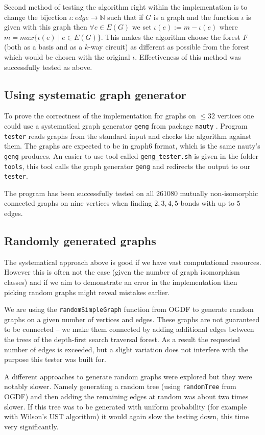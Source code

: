Second method of testing the algorithm right within the implementation is to change the bijection $\iota : edge \rightarrow \mathbb{N}$ such that if $G$ is a graph and the function $\iota$ is given with this graph then $\forall e \in E(G)$ we set $\iota(e) := m - \iota(e)$ where $m = max \{ \iota(e) \mid e \in E(G) \}$. This makes the algorithm choose the forest $F$ (both as a basis and as a $k$-way circuit) as different as possible from the forest which would be chosen with the original $\iota$. Effectiveness of this method was successfully tested as above.

\subsection*{Using systematic graph generator}

To prove the correctness of the implementation for graphs on $\leq 32$ vertices one could use a systematical graph generator \lstinline|geng| from package \lstinline|nauty| \cite{mckay_isom}. Program \lstinline|tester| reads graphs from the standard input and checks the algorithm against them. The graphs are expected to be in graph6 format, which is the same nauty's \lstinline|geng| produces. An easier to use tool called \lstinline|geng_tester.sh| is given in the folder \lstinline|tools|, this tool calls the graph generator \lstinline|geng| and redirects the output to our \lstinline|tester|.

The program has been successfully tested on all 261080 mutually non-isomorphic connected graphs on nine vertices when finding $2,3,4,5$-bonds with up to $5$ edges.

\subsection*{Randomly generated graphs}

The systematical approach above is good if we have vast computational resources. However this is often not the case (given the number of graph isomorphism classes) and if we aim to demonstrate an error in the implementation then picking random graphs might reveal mistakes earlier.

We are using the \lstinline|randomSimpleGraph| function from OGDF to generate random graphs on a given number of vertices and edges. These graphs are not guaranteed to be connected -- we make them connected by adding additional edges between the trees of the depth-first search traversal forest. As a result the requested number of edges is exceeded, but a slight variation does not interfere with the purpose this tester was built for.

A different approaches to generate random graphs were explored but they were notably slower. Namely generating a random tree (using \lstinline|randomTree| from OGDF) and then adding the remaining edges at random was about two times slower. If this tree was to be generated with uniform probability (for example with Wilson's UST algorithm) it would again slow the testing down, this time very significantly.

